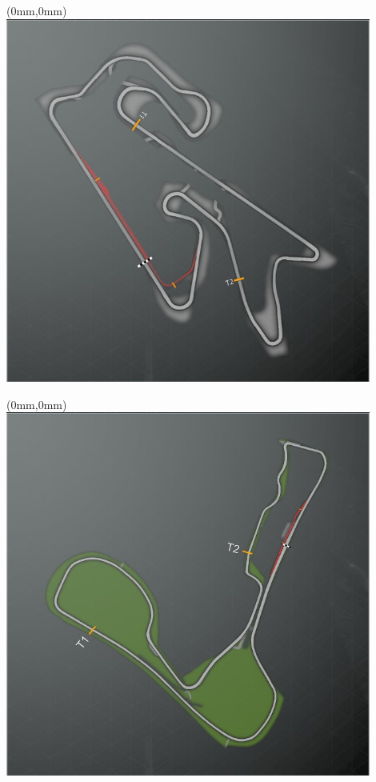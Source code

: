 \null\newpage
\begin{textblock*}{30mm}(0mm,0mm)%
\includegraphics[width=120mm]{TR/2015-05-20_00024.png}
\end{textblock*}
\null\newpage
\begin{textblock*}{30mm}(0mm,0mm)%
\includegraphics[width=120mm]{TR/2015-05-20_00010.png}
\end{textblock*}

